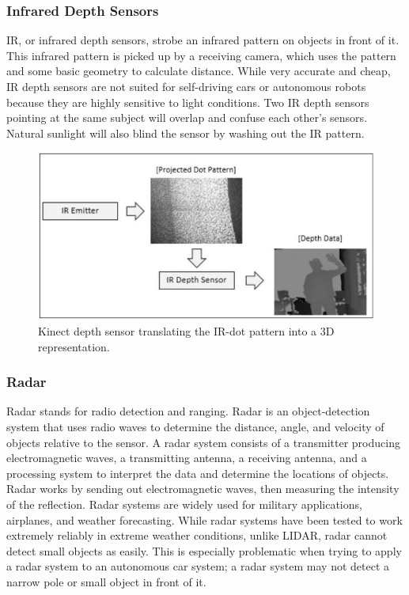 \documentclass[onecolumn, draftclsnofoot,10pt, compsoc]{IEEEtran}
\makeatletter
\newcommand\captionof[1]{\def\@captype{#1}\caption}
\makeatother
\begin{document}
\begin{singlespace}
		\subsubsection{Infrared Depth Sensors}
			IR, or infrared depth sensors, strobe an infrared pattern on objects in front of it.
			This infrared pattern is picked up by a receiving camera, which uses the pattern and some basic geometry to calculate distance.
			While very accurate and cheap, IR depth sensors are not suited for self-driving cars or autonomous robots because they are highly sensitive to light conditions.
			Two IR depth sensors pointing at the same subject will overlap and confuse each other's sensors.
			Natural sunlight will also blind the sensor by washing out the IR pattern. \cite{ibrahim_2018}

		\begin{figure}[H]
			\includegraphics[scale=0.5]{kinect_depth.jpg}
			\captionof{figure}{Kinect depth sensor translating the IR-dot pattern into a 3D representation. \cite{ibrahim_2018}}
			\label{kinect}
		\end{figure}

		\subsubsection{Radar}
			Radar stands for radio detection and ranging.
			Radar is an object-detection system that uses radio waves to determine the distance, angle, and velocity of objects relative to the sensor.
			A radar system consists of a transmitter producing electromagnetic waves, a transmitting antenna, a receiving antenna, and a processing system to interpret the data and determine the locations of objects.
			Radar works by sending out electromagnetic waves, then measuring the intensity of the reflection. 
			Radar systems are widely used for military applications, airplanes, and weather forecasting.
			While radar systems have been tested to work extremely reliably in extreme weather conditions, unlike LIDAR, radar cannot detect small objects as easily. 
			This is especially problematic when trying to apply a radar system to an autonomous car system; a radar system may not detect a narrow pole or small object in front of it. \cite{aus}



\end{singlespace}
\end{document}
